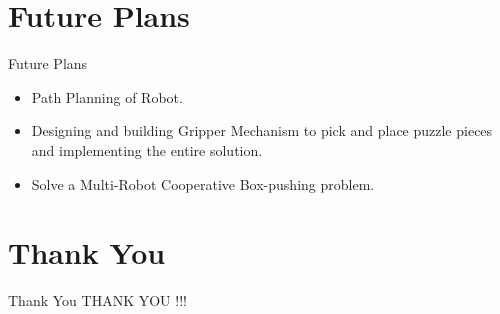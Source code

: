 \documentclass[10pt,a4paper]{beamer}
\begin{document}
\section{Future Plans}
\begin{frame}{Future Plans}
	\begin{itemize}
		\item Path Planning of Robot.\pause
		\item Designing and building Gripper Mechanism to pick and place puzzle pieces and implementing the entire solution.\pause
		\item Solve a Multi-Robot Cooperative Box-pushing problem.
	\end{itemize}
\end{frame}


\section{Thank You}
\begin{frame}{Thank You}
	\centering THANK YOU !!!
\end{frame}
\end{document}
